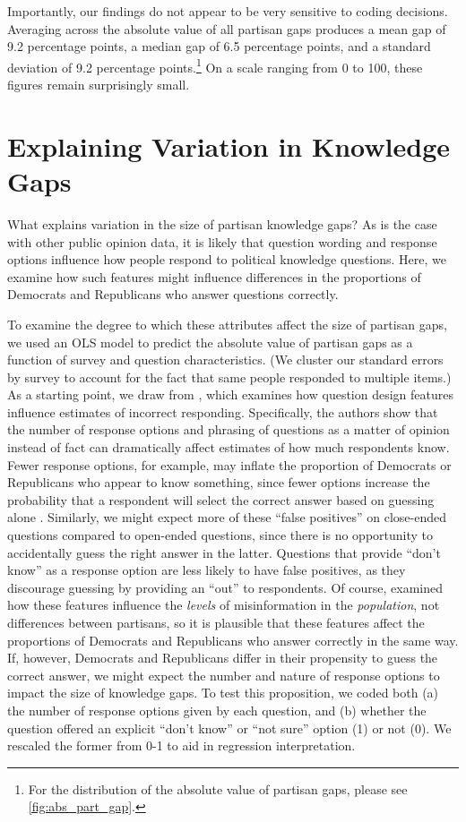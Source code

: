 \documentclass[12pt, letterpaper]{article}
\begin{document}
Importantly, our findings do not appear to be very sensitive to coding decisions. Averaging across the absolute value of all partisan gaps produces a mean gap of 9.2 percentage points, a median gap of 6.5 percentage points, and a standard deviation of 9.2 percentage points.\footnote{For the distribution of the absolute value of partisan gaps, please see \ref{fig:abs_part_gap}.} On a scale ranging from 0 to 100, these figures remain surprisingly small. 

\section*{Explaining Variation in Knowledge Gaps}

What explains variation in the size of partisan knowledge gaps? As is the case with other public opinion data, it is likely that question wording and response options influence how people respond to political knowledge questions. Here, we examine how such features might influence differences in the proportions of Democrats and Republicans who answer questions correctly.

To examine the degree to which these attributes affect the size of partisan gaps, we used an OLS model to predict the absolute value of partisan gaps as a function of survey and question characteristics. (We cluster our standard errors by survey to account for the fact that same people responded to multiple items.) As a starting point, we draw from \citet{luskinetal_nd}, which examines how question design features influence estimates of incorrect responding. Specifically, the authors show that the number of response options and phrasing of questions as a matter of opinion instead of fact can dramatically affect estimates of how much respondents know. Fewer response options, for example, may inflate the proportion of Democrats or Republicans who appear to know something, since fewer options increase the probability that a respondent will select the correct answer based on guessing alone \citep[][4]{luskinetal_nd}. Similarly, we might expect more of these ``false positives'' on close-ended questions compared to open-ended questions, since there is no opportunity to accidentally guess the right answer in the latter. Questions that provide ``don't know'' as a response option are less likely to have false positives, as they discourage guessing by providing an ``out'' to respondents. Of course, \citet{luskinetal_nd} examined how these features influence the \textit{levels} of misinformation in the \textit{population}, not differences between partisans, so it is plausible that these features affect the proportions of Democrats and Republicans who answer correctly in the same way. If, however, Democrats and Republicans differ in their propensity to guess the correct answer, we might expect the number and nature of response options to impact the size of knowledge gaps. To test this proposition, we coded both (a) the number of response options given by each question, and (b) whether the question offered an explicit ``don't know'' or ``not sure'' option (1) or not (0). We rescaled the former from 0-1 to aid in regression interpretation. 
\end{document}
